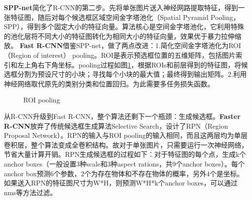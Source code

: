 \textbf{SPP-net}\cite{he2015spatial}简化了R-CNN的第二步。先将单张图片送入神经网路提取特征，得到一张特征图，随后对每个候选框区域空间金字塔池化（Spatial Pyramid Pooling，SPP），得到多个固定大小的特征向量。算法核心是空间金字塔池化，它利用特殊的池化层将不同大小的特征图转化为相同大小的特征向量，效果优于暴力拉伸缩放。
\textbf{Fast R-CNN}\cite{girshick2015fast}借鉴SPP-net，做了两点改进：1.简化空间金字塔池化为ROI（Region of interest） pooling。ROI是表示预选框位置的五维矩阵，包括图片索引和左上角右下角坐标。pooling过程如图\ref{fig:ROI}，根据ROIs和前层得到的特征图，将候选框分割为预设尺寸的小块；寻找每个小块的最大值；最终得到输出矩阵。2.利用神经网络取代原先的类别分类和位置回归。为此需要多任务损失函数。
\begin{figure}
    \centering
    \caption{ROI pooling}
    \label{fig:ROI}
\end{figure}

从R-CNN升级到Fast R-CNN，整个算法还剩下一个瓶颈：生成候选框。\textbf{Faster R-CNN}\cite{ren2015faster}放弃了传统候选框生成算法Selective Search，设计了RPN（Region Proposal Network）。RPN的输入与ROI pooling的输入相同，而且这两层均为单层卷积层，整个算法变成全卷积结构。故对于单张图片，只需要运行一次神经网络，节省大量计算开销。RPN生成候选框的过程如下：对于特征图的每个点，生成k个anchor boxes（一般设置3种scale和3种aspect rations，共9个anchor boxes）。每个anchor box预测6个参数，2个为存在物体和不存在物体的概率，另外4个是坐标。如果送入RPN的特征图尺寸为W*H，则预测W*H*k个anchor boxes，可以通过nms等方法过滤。


